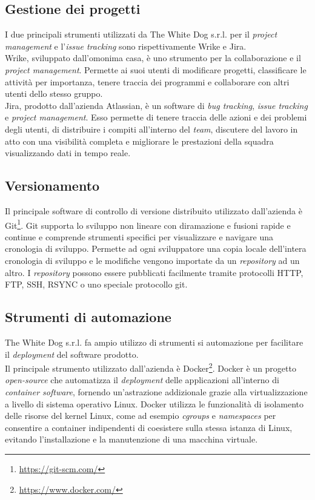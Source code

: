 \subsection{Gestione dei progetti}

I due principali strumenti utilizzati da The White Dog s.r.l. per il \textit{project management} e l'\textit{issue tracking} sono rispettivamente Wrike e Jira.\\
Wrike, sviluppato dall'omonima casa, è uno strumento per la collaborazione e il \textit{project management}. Permette ai suoi utenti di modificare progetti, classificare le attività per importanza, tenere traccia dei programmi e collaborare con altri utenti dello stesso gruppo. \\
Jira, prodotto dall'azienda Atlassian, è un software di \textit{bug tracking}, \textit{issue tracking} e \textit{project management}. Esso permette di tenere traccia delle azioni e dei problemi degli utenti, di distribuire i compiti all'interno del \textit{team}, discutere del lavoro in atto con una visibilità completa e migliorare le prestazioni della squadra visualizzando dati in tempo reale.

\subsection{Versionamento}

Il principale software di controllo di versione distribuito utilizzato dall'azienda è Git\footnote[7]{\url{https://git-scm.com/}}. Git supporta lo sviluppo non lineare con diramazione e fusioni rapide e continue e comprende strumenti specifici per visualizzare e navigare una cronologia di sviluppo. Permette ad ogni sviluppatore una copia locale dell'intera cronologia di sviluppo e le modifiche vengono importate da un \textit{repository} ad un altro. I \textit{repository} possono essere pubblicati facilmente tramite protocolli HTTP, FTP, SSH, RSYNC o uno speciale protocollo git.

\subsection{Strumenti di automazione}

The White Dog s.r.l. fa ampio utilizzo di strumenti si automazione per facilitare il \textit{deployment} del software prodotto. \\
Il principale strumento utilizzato dall'azienda è Docker\footnote[8]{\url{https://www.docker.com/}}. Docker è un progetto \textit{open-source} che automatizza il \textit{deployment} delle applicazioni all'interno di \textit{container software}, fornendo un'astrazione addizionale grazie alla virtualizzazione a livello di sistema operativo Linux. Docker utilizza le funzionalità di isolamento delle risorse del kernel Linux, come ad esempio \textit{cgroups} e \textit{namespaces} per consentire a container indipendenti di coesistere sulla stessa istanza di Linux, evitando l'installazione e la manutenzione di una macchina virtuale.


